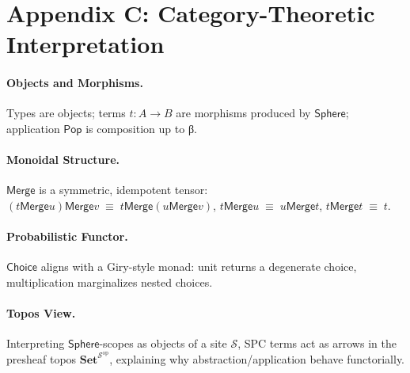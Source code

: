 \documentclass[12pt]{article}
\newcommand{\Sphere}{\mathsf{Sphere}}
\newcommand{\Pop}{\mathsf{Pop}}
\newcommand{\Merge}{\mathsf{Merge}}
\newcommand{\Choice}{\mathsf{Choice}}
\newcommand{\Equiv}{\;\equiv\;}
\newcommand{\SphereCat}{\mathcal{S}}
\newcommand{\ToPos}{\mathbf{Set}^{\SphereCat^{\mathrm{op}}}}
\theoremstyle{definition}
\begin{document}
\section{Appendix C: Category-Theoretic Interpretation}
\paragraph{Objects and Morphisms.}
Types are objects; terms $t:A\to B$ are morphisms produced by $\Sphere$; application $\Pop$ is composition up to β.

\paragraph{Monoidal Structure.}
$\Merge$ is a symmetric, idempotent tensor: $(t\Merge u)\Merge v \Equiv t\Merge(u\Merge v)$, $t\Merge u \Equiv u\Merge t$, $t\Merge t \Equiv t$.

\paragraph{Probabilistic Functor.}
$\Choice$ aligns with a Giry-style monad: unit returns a degenerate choice, multiplication marginalizes nested choices.

\paragraph{Topos View.}
Interpreting $\Sphere$-scopes as objects of a site $\SphereCat$, SPC terms act as arrows in the presheaf topos $\ToPos$, explaining why abstraction/application behave functorially.
\end{document}
